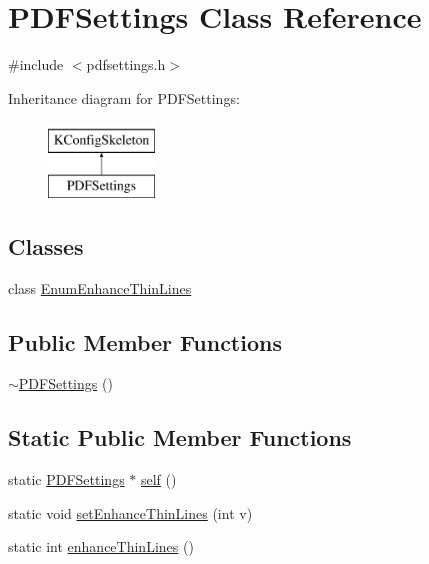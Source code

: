 \hypertarget{classPDFSettings}{\section{P\+D\+F\+Settings Class Reference}
\label{classPDFSettings}
}


{\ttfamily \#include $<$pdfsettings.\+h$>$}

Inheritance diagram for P\+D\+F\+Settings\+:\begin{figure}[H]
\begin{center}
\leavevmode
\includegraphics[height=2.000000cm]{classPDFSettings}
\end{center}
\end{figure}
\subsection*{Classes}
\begin{DoxyCompactItemize}
\item 
class \hyperlink{classPDFSettings_1_1EnumEnhanceThinLines}{Enum\+Enhance\+Thin\+Lines}
\end{DoxyCompactItemize}
\subsection*{Public Member Functions}
\begin{DoxyCompactItemize}
\item 
\hyperlink{classPDFSettings_a9010297cef20c950da404b4a8d96d9a1}{$\sim$\+P\+D\+F\+Settings} ()
\end{DoxyCompactItemize}
\subsection*{Static Public Member Functions}
\begin{DoxyCompactItemize}
\item 
static \hyperlink{classPDFSettings}{P\+D\+F\+Settings} $\ast$ \hyperlink{classPDFSettings_a30b635d7a919a55642c4afab86f54b20}{self} ()
\item 
static void \hyperlink{classPDFSettings_ac58335bdcafb1bc59fd2af6a0a533154}{set\+Enhance\+Thin\+Lines} (int v)
\item 
static int \hyperlink{classPDFSettings_a27d9665a4b088dcd54a865308d32317c}{enhance\+Thin\+Lines} ()
\end{DoxyCompactItemize}
